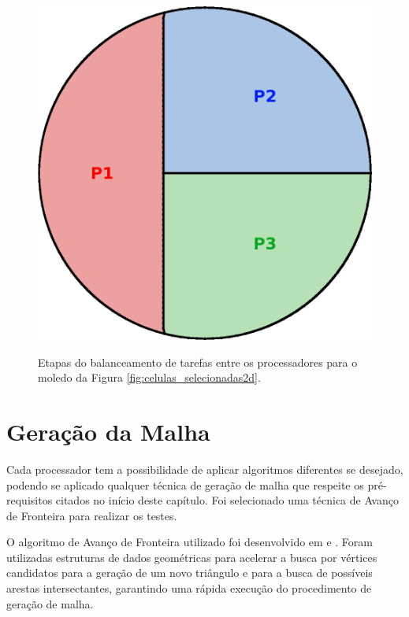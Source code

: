 \begin{figure}[!ht]
{		\begin{minipage}[c]{0.3\textwidth}{\includegraphics[width=\textwidth]{fig/balanceamento2.png}}\end{minipage}
	}
	\caption{Etapas do balanceamento de tarefas entre os processadores para o moledo da Figura \ref{fig:celulas_selecionadas2d}.}
	\label{fig:balanceamento_esfera}
\end{figure}


\section{Geração da Malha}

Cada processador tem a possibilidade de aplicar algoritmos diferentes se desejado, podendo se aplicado qualquer técnica de geração de malha que respeite os pré-requisitos citados no início deste capítulo. Foi selecionado uma técnica de Avanço de Fronteira para realizar os testes.

O algoritmo de Avanço de Fronteira utilizado foi desenvolvido em \cite{bib:Miranda99} e \cite{bib:Cavalcante-Neto01}. Foram utilizadas estruturas de dados geométricas para acelerar a busca por vértices candidatos para a geração de um novo triângulo e para a busca de possíveis arestas intersectantes, garantindo uma rápida execução do procedimento de geração de malha.

